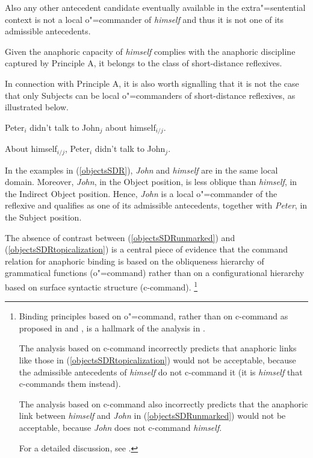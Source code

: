 \documentclass[output=paper
,modfonts
,nonflat]{langsci/langscibook}
\begin{document}
Also any other antecedent candidate eventually available in the extra"=sentential context is not
a local o"=commander of {\em himself} and thus it is not one of its admissible antecedents.

Given the anaphoric capacity of {\em himself} complies with  the anaphoric discipline captured 
by Principle A, it belongs to the class of short-distance reflexives.

In connection with Principle A, it is also worth signalling that it is not the case that only Subjects
can be local o"=commanders of short-distance reflexives, as illustrated below.

\begin{exe}
\ex
\label{objectsSDR}
\begin{xlist}

\ex Peter$_{i}$ didn't talk to John$_{j}$ about himself$_{i/j}$.
\label{objectsSDRunmarked}
 
\ex About himself$_{i/j}$, Peter$_{i}$ didn't talk to John$_{j}$.
\label{objectsSDRtopicalization}
\end{xlist}

\end{exe}

In the examples in (\ref{objectsSDR}), {\em John} and {\em himself} are in the same local domain.
Moreover, {\em John}, in the Object position, is less oblique than {\em himself}, in the Indirect Object position. Hence, {\em John}
is a local o"=commander of the reflexive and qualifies as one of its admissible
antecedents, together with {\em Peter}, in the Subject position.

The absence of contrast between 
(\ref{objectsSDRunmarked}) and (\ref{objectsSDRtopicalization}) is a central piece of evidence that 
the command relation for anaphoric binding is based on the obliqueness hierarchy of grammatical functions (o"=command) 
rather than on a configurational hierarchy based on surface syntactic structure (c-command).%
\footnote{Binding principles based on o"=command, rather than on c-command as proposed in \citep{chom:bind80} and \citep{chom:knowledge86}, 
is a hallmark of the analysis in \citep{polsag:binding92}.

The analysis based on c-command incorrectly predicts
that anaphoric links like those in (\ref{objectsSDRtopicalization}) would not be acceptable, because the
admissible antecedents of {\em himself} do not c-command it (it is {\em himself} that c-commands them instead).

The analysis based on c-command also incorrectly predicts
that the anaphoric link between {\em himself} and {\em John} in (\ref{objectsSDRunmarked}) would not be acceptable, because
{\em John} does not c-command {\em himself}.

For a detailed discussion, see \citep[Chap.6]{polsag:hpsg94}.
}
\end{document}

